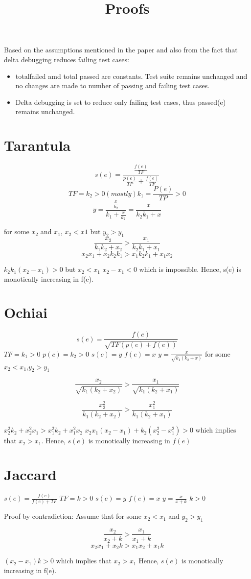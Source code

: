 \documentclass{article}
\title{Proofs}
\begin{document}
Based on the assumptions mentioned in the paper and also from the fact that
delta debugging reduces failing test cases:
\begin{itemize}
\item totalfailed amd total passed are constants. Test suite remains unchanged 
and no changes are made to number of passing and failing test cases.
\item Delta debugging is set to reduce only failing test cases, thus passed(e) remains
unchanged.
\end{itemize}
\section{Tarantula}

\[
s(e) = \frac{\frac{f(e)}{TF}}{\frac{p(e)}{TP} + \frac{f(e)}{TF}}
\]
\[
TF = k_2 > 0 (mostly) k_1 = \frac{P(e)}{TP} > 0
\]
\[
y = \frac{\frac{x}{k_2}}{k_1 + \frac{x}{k_2}} = \frac{x}{k_2 k_1 + x}
\]

for some $x_2$ and $x_1$, $x_2 < x1$  but $y_2> y_1$
\[
\frac{x_2}{k_1 k_2+ x_2} > \frac{x_1}{k_2 k_1 + x_1}
\]
\[
x_2 x_1 + x_2 k_2 k_1 > x_1 k_2 k_1 + x_1 x_2
\]

$k_2 k_1 (x_2 - x_1) > 0$ but $x_2 < x_1$ $x_2 - x_1 < 0$ which is impossible.
Hence, s(e) is monotically increasing in f(e).

\section{Ochiai}
\[
s(e)  = \frac{f(e)}{\sqrt{TF(p(e)+f(e))}}
\]
$TF = k_1 > 0 $ $p(c) = k_2> 0$ $s(c) = y$ $f(e)=x$
$y=\frac{x}{\sqrt{k_1 (k_2 +x)}}$
for some $x_2 < x_1$,$ y_2 > y_1$

\[
\frac{x_2}{\sqrt{k_1 (k_2 + x_2)}}> \frac{x_1}{ \sqrt{k_1(k_2 + x_1)}}
\]


\[
\frac{x^{2}_2}{{k_1 (k_2 + x_2)}}> \frac{x^{2}_1}{k_1 (k_2 + x_1)}
\]

$x^{2}_2 k_2 + x^{2}_2 x_1 > x^{2}_1 k_2 + x^{2}_1 x_2$
$x_2 x_1  (x_2 - x_1) + k_2 (x^{2}_{2}-x^{2}_{1}) > 0$
which implies that $x_2 > x_1$.
Hence, $s(e)$ is monotically increasing in $f(e)$

\section{Jaccard}
$s(e) = \frac{f(e)}{f(e)+TF}$
$TF=k> 0$ $s(e)=y$ $f(e)=x$
$y=\frac{x}{x+k}$ $k > 0$

Proof by contradiction:
Assume that for some $x_2 < x_1$ and $y_2 > y_1$

\[
\frac{x_2}{x_2 + k} > \frac{x_1}{x_1 + k}
\]
\[
x_2 x_1 + x_2 k > x_1 x_2 + x_1 k
\]

$(x_2 - x_1) k > 0$ which implies that  $x_2 > x_1$
Hence, $s(e)$ is monotically increasing in f(e).
\end{document}

